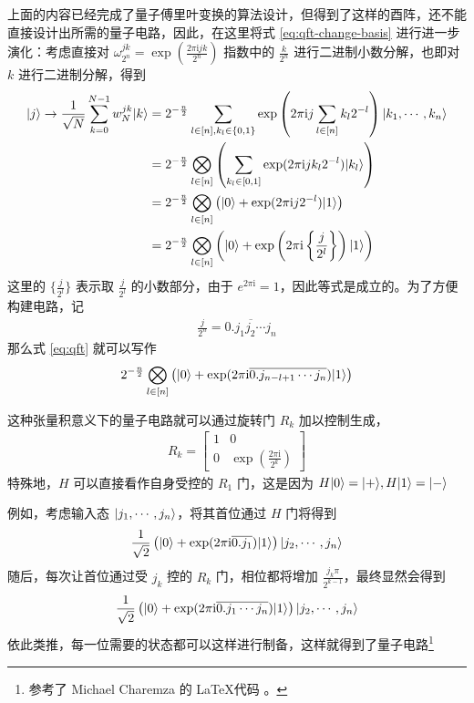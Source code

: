 上面的内容已经完成了量子傅里叶变换的算法设计，但得到了这样的酉阵，还不能直接设计出所需的量子电路，因此，在这里将式 \ref{eq:qft-change-basis} 进行进一步演化：考虑直接对 $\omega_{2^n}^{jk}=\exp(\frac{2\pi\mathrm{i} jk}{2^n})$ 指数中的 $\frac{k}{2^n}$ 进行二进制小数分解，也即对 $k$ 进行二进制分解，得到 \begin{align}\begin{aligned}
        |j\rangle\to\frac{1}{\sqrt{N}}\sum_{k=0}^{N-1}w_N^{jk}|k\rangle
         & =2^{-\frac{n}{2}}\sum_{l\in[n],k_l\in\{0,1\}}\exp\left(2\pi\mathrm{i} j\sum_{l\in[n]}k_l2^{-l}\right)|k_1,\cdots,k_n\rangle                  \\
         & =2^{-\frac{n}{2}}\bigotimes_{l\in[n]}\left(\sum_{k_l\in[0,1]}\exp(2\pi\mathrm{i} jk_l2^{-l})|k_l\rangle\right)                               \\
         & =2^{-\frac{n}{2}}\bigotimes_{l\in[n]}\left(|0\rangle+\exp(2\pi\mathrm{i} j2^{-l})|1\rangle\right)                                              \\
         & =2^{-\frac{n}{2}}\bigotimes_{l\in[n]}\left(|0\rangle+\exp\left(2\pi\mathrm{i}\left\{\frac{j}{2^l}\right\}\right)|1\rangle\right)\label{eq:qft}
    \end{aligned}\end{align}
这里的 $\{\frac{j}{2^l}\}$ 表示取 $\frac{j}{2^l}$ 的小数部分，由于 $e^{2\pi\mathrm{i}}=1$，因此等式是成立的。为了方便构建电路，记 \begin{align*}
    \frac{j}{2^n}=\overline{0.j_1 j_2\cdots j_n}
\end{align*}
那么式 \ref{eq:qft} 就可以写作 \begin{align*}
    2^{-\frac{n}{2}}\bigotimes_{l\in[n]}\left(|0\rangle+\exp(2\pi\mathrm{i}\overline{0.j_{n-l+1}\cdots j_{n}})|1\rangle\right)
\end{align*}

这种张量积意义下的量子电路就可以通过旋转门 $R_k$ 加以控制生成，\begin{align*}
    R_k=\begin{bmatrix}
            1 & 0                                           \\
            0 & \exp\left(\frac{2\pi\mathrm{i}}{2^k}\right)
        \end{bmatrix}
\end{align*}
特殊地，$H$ 可以直接看作自身受控的 $R_1$ 门，这是因为 $H|0\rangle=|+\rangle,H|1\rangle=|-\rangle$

例如，考虑输入态 $|j_1,\cdots,j_n\rangle$，将其首位通过 $H$ 门将得到 \begin{align*}
    \frac{1}{\sqrt{2}}\left(|0\rangle+\exp(2\pi\mathrm{i}\overline{0.j_1})|1\rangle\right)|j_2,\cdots,j_n\rangle
\end{align*}
随后，每次让首位通过受 $j_k$ 控的 $R_k$ 门，相位都将增加 $\frac{j_k\pi}{2^{k-1}}$，最终显然会得到 \begin{align*}
    \frac{1}{\sqrt{2}}\left(|0\rangle+\exp(2\pi\mathrm{i}\overline{0.j_1\cdots j_n})|1\rangle\right)|j_2,\cdots,j_n\rangle
\end{align*}
依此类推，每一位需要的状态都可以这样进行制备，这样就得到了量子电路\footnote{参考了 Michael Charemza 的 \LaTeX 代码 \cite{charemza2006examples}。}

